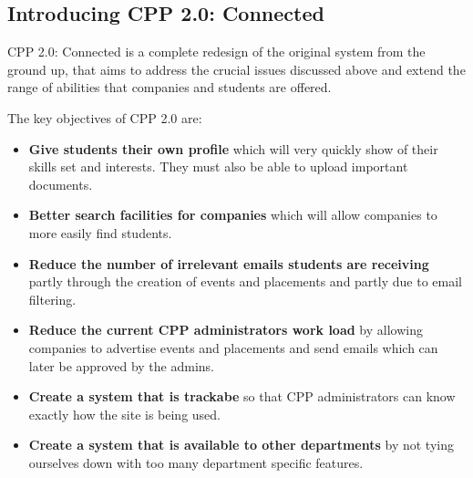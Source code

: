 \subsection{Introducing CPP 2.0: Connected}
CPP 2.0: Connected is a complete redesign of the original system from the ground up, that aims to address the crucial issues discussed above and extend the range of abilities that companies and students are offered.

The key objectives of CPP 2.0 are:
\begin{itemize}
  \item \textbf{Give students their own profile} which will very quickly show of their skills set and interests. They must also be able to upload important documents.
  \item \textbf{Better search facilities for companies} which will allow companies to more easily find students.
  \item \textbf{Reduce the number of irrelevant emails students are receiving} partly through the creation of events and placements and partly due to email filtering.
  \item \textbf{Reduce the current CPP administrators work load} by allowing companies to advertise events and placements and send emails which can later be approved by the admins.
  \item \textbf{Create a system that is trackabe} so that CPP administrators can know exactly how the site is being used.
  \item \textbf{Create a system that is available to other departments} by not tying ourselves down with too many department specific features.
\end{itemize}